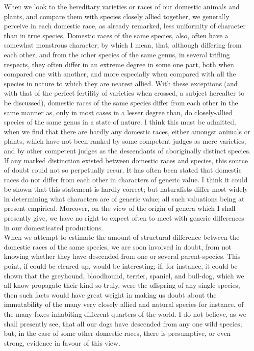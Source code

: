 \indent When we look to the hereditary varieties or races of our domestic animals and plants, and compare them with species closely allied together, we generally perceive in each domestic race, as already remarked, less uniformity of character than in true species. Domestic races of the same species, also, often have a somewhat monstrous character; by which I mean, that, although differing from each other, and from the other species of the same genus, in several trifling respects, they often differ in an extreme degree in some one part, both when compared one with another, and more especially when compared with all the species in nature to which they are nearest allied. With these exceptions (and with that of the perfect fertility of varieties when crossed, a subject hereafter to be discussed), domestic races of the same species differ from each other in the same manner as, only in most cases in a lesser degree than, do closely-allied species of the same genus in a state of nature. I think this must be admitted, when we find that there are hardly any domestic races, either amongst animals or plants, which have not been ranked by some competent judges as mere varieties, and by other competent judges as the descendants of aboriginally distinct species. If any marked distinction existed between domestic races and species, this source of doubt could not so perpetually recur. It has often been stated that domestic races do not differ from each other in characters of generic value. I think it could be shown that this statement is hardly correct; but naturalists differ most widely in determining what characters are of generic value; all such valuations being at present empirical. Moreover, on the view of the origin of genera which I shall presently give, we have no right to expect often to meet with generic differences in our domesticated productions.  \\
\indent When we attempt to estimate the amount of structural difference between the domestic races of the same species, we are soon involved in doubt, from not knowing whether they have descended from one or several parent-species. This point, if could be cleared up, would be interesting; if, for instance, it could be shown that the greyhound, bloodhound, terrier, spaniel, and bull-dog, which we all know propagate their kind so truly, were the offspring of any single species, then such facts would have great weight in making us doubt about the immutability of the many very closely allied and natural species for instance, of the many foxes inhabiting different quarters of the world. I do not believe, as we shall presently see, that all our dogs have descended from any one wild species; but, in the case of some other domestic races, there is presumptive, or even strong, evidence in favour of this view.  \\
